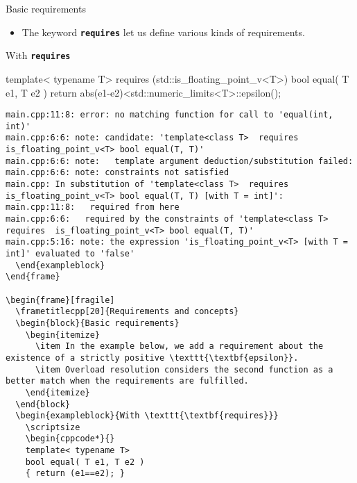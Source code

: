 \begin{frame}[fragile]
  \begin{block}{Basic requirements}
    \begin{itemize}
      \item The keyword \texttt{\textbf{requires}} let us define various kinds of requirements.
    \end{itemize}
  \end{block}
  \begin{exampleblock}{With \texttt{\textbf{requires}}}
    \scriptsize
    \begin{cppcode*}{}
    template< typename T>
    requires (std::is_floating_point_v<T>)
    bool equal( T e1, T e2 )
    { return abs(e1-e2)<std::numeric_limits<T>::epsilon(); }
    \end{cppcode*}
    \tiny
    \begin{verbatim}
main.cpp:11:8: error: no matching function for call to 'equal(int, int)'
main.cpp:6:6: note: candidate: 'template<class T>  requires  is_floating_point_v<T> bool equal(T, T)'
main.cpp:6:6: note:   template argument deduction/substitution failed:
main.cpp:6:6: note: constraints not satisfied
main.cpp: In substitution of 'template<class T>  requires  is_floating_point_v<T> bool equal(T, T) [with T = int]':
main.cpp:11:8:   required from here
main.cpp:6:6:   required by the constraints of 'template<class T>  requires  is_floating_point_v<T> bool equal(T, T)'
main.cpp:5:16: note: the expression 'is_floating_point_v<T> [with T = int]' evaluated to 'false'
  \end{exampleblock}
\end{frame}

\begin{frame}[fragile]
  \frametitlecpp[20]{Requirements and concepts}
  \begin{block}{Basic requirements}
    \begin{itemize}
      \item In the example below, we add a requirement about the existence of a strictly positive \texttt{\textbf{epsilon}}.
      \item Overload resolution considers the second function as a better match when the requirements are fulfilled.
    \end{itemize}
  \end{block}
  \begin{exampleblock}{With \texttt{\textbf{requires}}}
    \scriptsize
    \begin{cppcode*}{}
    template< typename T>
    bool equal( T e1, T e2 )
    { return (e1==e2); }


\end{verbatim}
\end{exampleblock}
\end{frame}
